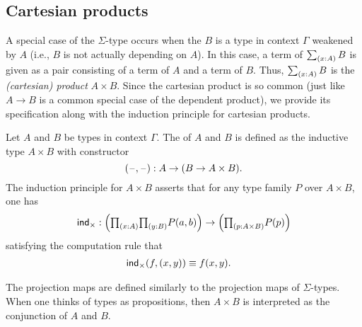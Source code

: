 \subsection{Cartesian products}
A special case of the $\Sigma$-type occurs when the $B$ is a type in context $\Gamma$ weakened by $A$ (i.e., $B$ is not actually depending on $A$). In this case, a term of $\sm{x:A}B$ is given as a pair consisting of a term of $A$ and a term of $B$. Thus, $\sm{x:A}B$ is the \emph{(cartesian) product} $A\times B$. Since the cartesian product is so common (just like $A\to B$ is a common special case of the dependent product), we provide its specification along with the induction principle for cartesian products.

\begin{defn}
Let $A$ and $B$ be types in context $\Gamma$. The  of $A$ and $B$ is defined as the inductive type $A\times B$ with constructor
\begin{equation*}
(\mathord{\hspace{1pt}\text{--}\hspace{1pt}},\mathord{\hspace{1pt}\text{--}\hspace{1pt}}):A\to (B\to A\times B).
\end{equation*}
The induction principle for $A\times B$ asserts that for any type family $P$ over $A\times B$, one has
\begin{equation*}
\ind{\times} : \Big(\prd{x:A}{y:B}P(a,b)\Big)\to\Big(\prd{p:A\times B} P(p)\Big)
\end{equation*}
satisfying the computation rule that
\begin{align*}
\mathsf{ind}_{\times}(f,(x,y)) & \equiv f(x,y).
\end{align*}
\end{defn}

The projection maps are defined similarly to the projection maps of $\Sigma$-types. When one thinks of types as propositions, then $A\times B$ is interpreted as the conjunction of $A$ and $B$.

